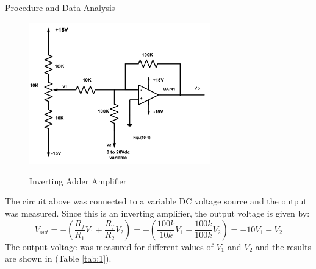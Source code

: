 \documentclass[12pt]{article}
\begin{document}
\clearpage
\h{Procedure and Data Analysis}
\begin{figure}[H]
    \centering
    \includegraphics[width=0.7\textwidth]{assets/main/2023-08-27-18-37-15.png}
    \caption{Inverting Adder Amplifier}
    \cite{manual}
    \label{fig:1}
\end{figure}
The circuit above was connected to a variable DC voltage source and the output was measured. Since this is an inverting amplifier, the output voltage is given by:
\begin{equation}
    V_{out} = -(\frac{R_f}{R_{1}}V_1 + \frac{R_f}{R_{2}}V_2) = -(\frac{100k}{10k}V_1 + \frac{100k}{100k}V_2) = -10V_1 - V_2
    \label{eq:1}
\end{equation}
The output voltage was measured for different values of $V_1$ and $V_2$ and the results are shown in (Table \ref{tab:1}).
\end{document}
